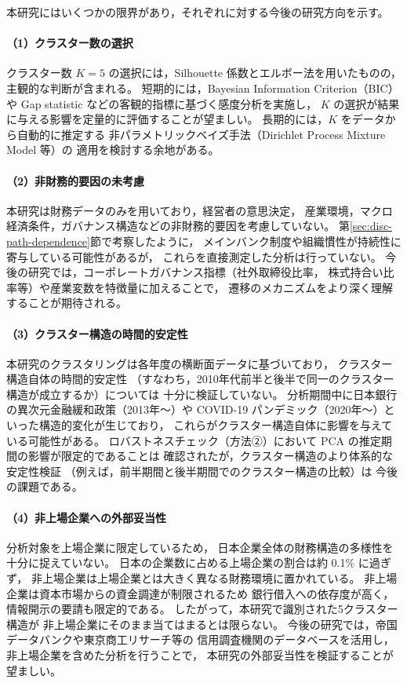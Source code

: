 本研究にはいくつかの限界があり，それぞれに対する今後の研究方向を示す。

\paragraph{（1）クラスター数の選択}
クラスター数 $K=5$ の選択には，Silhouette 係数とエルボー法を用いたものの，
主観的な判断が含まれる。
短期的には，Bayesian Information Criterion（BIC）や Gap statistic
などの客観的指標に基づく感度分析を実施し，
$K$ の選択が結果に与える影響を定量的に評価することが望ましい。
長期的には，$K$ をデータから自動的に推定する
非パラメトリックベイズ手法（Dirichlet Process Mixture Model 等）の
適用を検討する余地がある。

\paragraph{（2）非財務的要因の未考慮}
本研究は財務データのみを用いており，経営者の意思決定，
産業環境，マクロ経済条件，ガバナンス構造などの非財務的要因を考慮していない。
第\ref{sec:disc-path-dependence}節で考察したように，
メインバンク制度や組織慣性が持続性に寄与している可能性があるが，
これらを直接測定した分析は行っていない。
今後の研究では，コーポレートガバナンス指標（社外取締役比率，
株式持合い比率等）や産業変数を特徴量に加えることで，
遷移のメカニズムをより深く理解することが期待される。

\paragraph{（3）クラスター構造の時間的安定性}
本研究のクラスタリングは各年度の横断面データに基づいており，
クラスター構造自体の時間的安定性
（すなわち，2010年代前半と後半で同一のクラスター構造が成立するか）については
十分に検証していない。
分析期間中に日本銀行の異次元金融緩和政策（2013年〜）や
COVID-19 パンデミック（2020年〜）といった構造的変化が生じており，
これらがクラスター構造自体に影響を与えている可能性がある。
ロバストネスチェック（方法②）において PCA の推定期間の影響が限定的であることは
確認されたが，クラスター構造のより体系的な安定性検証
（例えば，前半期間と後半期間でのクラスター構造の比較）は
今後の課題である。

\paragraph{（4）非上場企業への外部妥当性}
分析対象を上場企業に限定しているため，
日本企業全体の財務構造の多様性を十分に捉えていない。
日本の企業数に占める上場企業の割合は約 0.1\% に過ぎず，
非上場企業は上場企業とは大きく異なる財務環境に置かれている。
非上場企業は資本市場からの資金調達が制限されるため
銀行借入への依存度が高く，情報開示の要請も限定的である。
したがって，本研究で識別された5クラスター構造が
非上場企業にそのまま当てはまるとは限らない。
今後の研究では，帝国データバンクや東京商工リサーチ等の
信用調査機関のデータベースを活用し，
非上場企業を含めた分析を行うことで，
本研究の外部妥当性を検証することが望ましい。

